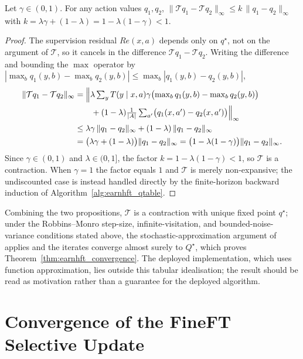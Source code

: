 \begin{proposition}
\label{prop:app_earnhft_contraction}
Let $\gamma\in(0,1)$. For any action values $q_1,q_2$, $\|\mathcal{T}q_1-\mathcal{T}q_2\|_\infty \le k\,\|q_1-q_2\|_\infty$ with $k=\lambda\gamma+(1-\lambda)=1-\lambda(1-\gamma)<1$.
\end{proposition}
\begin{proof}
The supervision residual $Re(x,a)$ depends only on $q^\star$, not on the argument of $\mathcal{T}$, so it cancels in the difference $\mathcal{T}q_1-\mathcal{T}q_2$. Writing the difference and bounding the $\max$ operator by $|\max_b q_1(y,b)-\max_b q_2(y,b)|\le\max_b|q_1(y,b)-q_2(y,b)|$,
\begin{align*}
\|\mathcal{T}q_1-\mathcal{T}q_2\|_\infty
&= \Bigl\| \lambda\textstyle\sum_y T(y\mid x,a)\gamma\bigl(\max_{b}q_1(y,b)-\max_{b}q_2(y,b)\bigr) \\
&\qquad + (1-\lambda)\tfrac{1}{|A|}\textstyle\sum_{a'}\bigl(q_1(x,a')-q_2(x,a')\bigr)\Bigr\|_\infty \\
&\le \lambda\gamma\,\|q_1-q_2\|_\infty + (1-\lambda)\,\|q_1-q_2\|_\infty \\
&= \bigl(\lambda\gamma+(1-\lambda)\bigr)\|q_1-q_2\|_\infty = \bigl(1-\lambda(1-\gamma)\bigr)\|q_1-q_2\|_\infty.
\end{align*}
Since $\gamma\in(0,1)$ and $\lambda\in(0,1]$, the factor $k=1-\lambda(1-\gamma)<1$, so $\mathcal{T}$ is a contraction. When $\gamma=1$ the factor equals $1$ and $\mathcal{T}$ is merely non-expansive; the undiscounted case is instead handled directly by the finite-horizon backward induction of Algorithm~\ref{alg:earnhft_qtable}.
\end{proof}

Combining the two propositions, $\mathcal{T}$ is a contraction with unique fixed point $q^\star$; under the Robbins--Monro step-size, infinite-visitation, and bounded-noise-variance conditions stated above, the stochastic-approximation argument of~\cite{jaakkola1993convergence} applies and the iterates converge almost surely to $Q^\star$, which proves Theorem~\ref{thm:earnhft_convergence}. The deployed implementation, which uses function approximation, lies outside this tabular idealisation; the result should be read as motivation rather than a guarantee for the deployed algorithm.

\section{Convergence of the FineFT Selective Update}
\label{app:fineft_proof}

